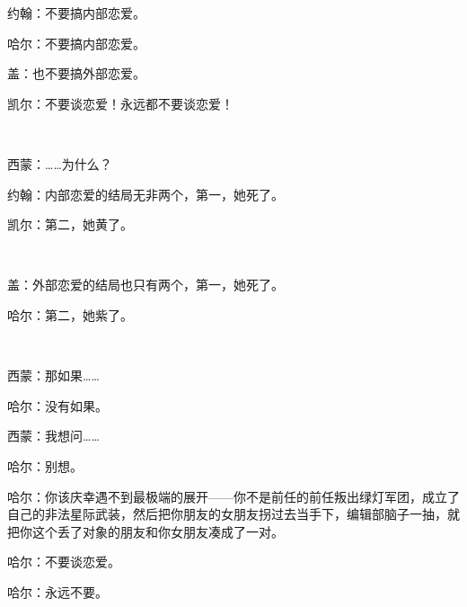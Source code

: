约翰：不要搞内部恋爱。

哈尔：不要搞内部恋爱。

盖：也不要搞外部恋爱。

凯尔：不要谈恋爱！永远都不要谈恋爱！

~\

西蒙：……为什么？

约翰：内部恋爱的结局无非两个，第一，她死了。

凯尔：第二，她黄了。

~\

盖：外部恋爱的结局也只有两个，第一，她死了。

哈尔：第二，她紫了。

~\

西蒙：那如果……

哈尔：没有如果。

西蒙：我想问……

哈尔：别想。

哈尔：你该庆幸遇不到最极端的展开——你不是前任的前任叛出绿灯军团，成立了自己的非法星际武装，然后把你朋友的女朋友拐过去当手下，编辑部脑子一抽，就把你这个丢了对象的朋友和你女朋友凑成了一对。

哈尔：不要谈恋爱。

哈尔：永远不要。

~\


